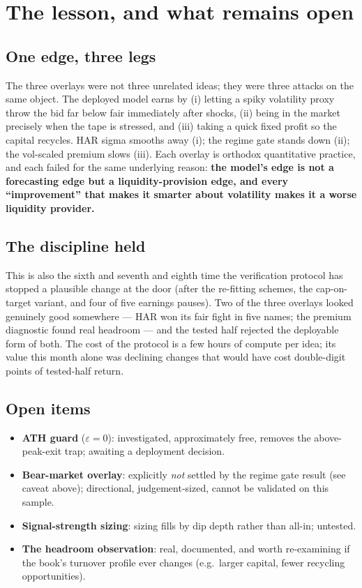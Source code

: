 \documentclass[11pt,a4paper]{article}
\begin{document}
\section{The lesson, and what remains open}

\subsection{One edge, three legs}

The three overlays were not three unrelated ideas; they were three attacks on the
same object. The deployed model earns by (i) letting a spiky volatility proxy
throw the bid far below fair immediately after shocks, (ii) being in the market
precisely when the tape is stressed, and (iii) taking a quick fixed profit so the
capital recycles. HAR sigma smooths away (i); the regime gate stands down (ii);
the vol-scaled premium slows (iii). Each overlay is orthodox quantitative
practice, and each failed for the same underlying reason: \textbf{the model's
edge is not a forecasting edge but a liquidity-provision edge, and every
``improvement'' that makes it smarter about volatility makes it a worse
liquidity provider.}

\subsection{The discipline held}

This is also the sixth and seventh and eighth time the verification protocol has
stopped a plausible change at the door (after the re-fitting schemes, the
cap-on-target variant, and four of five earnings pauses). Two of the three
overlays looked genuinely good somewhere --- HAR won its fair fight in five names;
the premium diagnostic found real headroom --- and the tested half rejected the
deployable form of both. The cost of the protocol is a few hours of compute per
idea; its value this month alone was declining changes that would have cost
double-digit points of tested-half return.

\subsection{Open items}

\begin{itemize}
\item \textbf{ATH guard} ($\varepsilon = 0$): investigated, approximately free,
removes the above-peak-exit trap; awaiting a deployment decision.
\item \textbf{Bear-market overlay}: explicitly \emph{not} settled by the regime
gate result (see caveat above); directional, judgement-sized, cannot be validated
on this sample.
\item \textbf{Signal-strength sizing}: sizing fills by dip depth rather than
all-in; untested.
\item \textbf{The headroom observation}: real, documented, and worth
re-examining if the book's turnover profile ever changes (e.g.\ larger capital,
fewer recycling opportunities).
\end{itemize}
\end{document}
